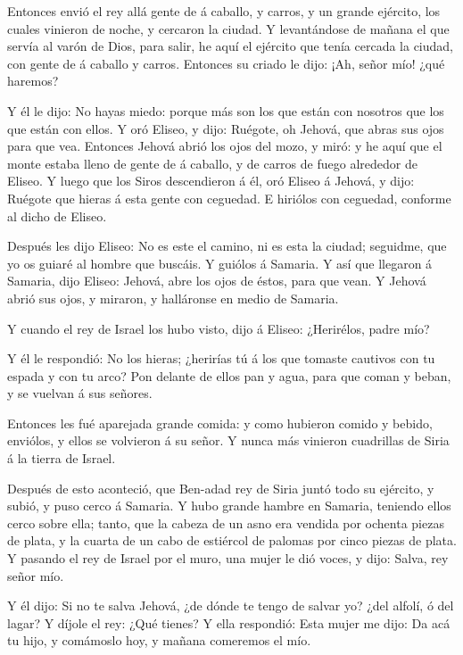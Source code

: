  Entonces envió el rey allá gente de á caballo, y carros, y
un grande ejército, los cuales vinieron de noche, y cercaron la ciudad.
 Y levantándose de mañana el que servía al varón de Dios,
para salir, he aquí el ejército que tenía cercada la ciudad, con gente
de á caballo y carros. Entonces su criado le dijo: ¡Ah, señor mío! ¿qué
haremos?

 Y él le dijo: No hayas miedo: porque más son los que están
con nosotros que los que están con ellos.  Y oró Eliseo, y
dijo: Ruégote, oh Jehová, que abras sus ojos para que vea. Entonces
Jehová abrió los ojos del mozo, y miró: y he aquí que el monte estaba
lleno de gente de á caballo, y de carros de fuego alrededor de Eliseo.
 Y luego que los Siros descendieron á él, oró Eliseo á
Jehová, y dijo: Ruégote que hieras á esta gente con ceguedad. E hiriólos
con ceguedad, conforme al dicho de Eliseo.

 Después les dijo Eliseo: No es este el camino, ni es esta
la ciudad; seguidme, que yo os guiaré al hombre que buscáis. Y guiólos á
Samaria.  Y así que llegaron á Samaria, dijo Eliseo:
Jehová, abre los ojos de éstos, para que vean. Y Jehová abrió sus ojos,
y miraron, y halláronse en medio de Samaria.

 Y cuando el rey de Israel los hubo visto, dijo á Eliseo:
¿Herirélos, padre mío?

 Y él le respondió: No los hieras; ¿herirías tú á los que
tomaste cautivos con tu espada y con tu arco? Pon delante de ellos pan y
agua, para que coman y beban, y se vuelvan á sus señores.

 Entonces les fué aparejada grande comida: y como hubieron
comido y bebido, enviólos, y ellos se volvieron á su señor. Y nunca más
vinieron cuadrillas de Siria á la tierra de Israel.

 Después de esto aconteció, que Ben-adad rey de Siria juntó
todo su ejército, y subió, y puso cerco á Samaria.  Y hubo
grande hambre en Samaria, teniendo ellos cerco sobre ella; tanto, que la
cabeza de un asno era vendida por ochenta piezas de plata, y la cuarta
de un cabo de estiércol de palomas por cinco piezas de plata.
 Y pasando el rey de Israel por el muro, una mujer le dió
voces, y dijo: Salva, rey señor mío.

 Y él dijo: Si no te salva Jehová, ¿de dónde te tengo de
salvar yo? ¿del alfolí, ó del lagar?  Y díjole el rey: ¿Qué
tienes? Y ella respondió: Esta mujer me dijo: Da acá tu hijo, y
comámoslo hoy, y mañana comeremos el mío.

